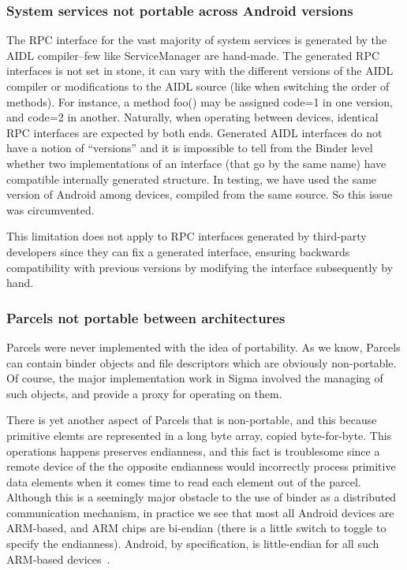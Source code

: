 \documentclass[prodmode]{acmlarge}
\begin{document}
\subsubsection{System services not portable across Android versions}
The RPC interface for the vast majority of system services is generated by the AIDL compiler--few like ServiceManager are hand-made. The generated RPC interfaces is not set in stone, it can vary with the different versions of the AIDL compiler or modifications to the AIDL source (like when switching the order of methods). For instance, a method foo() may be assigned code=1 in one version, and code=2 in another. Naturally, when operating between devices, identical RPC interfaces are expected by both ends. Generated AIDL interfaces do not have a notion of ``versions'' and it is impossible to tell from the Binder level whether two implementations of an interface (that go by the same name) have compatible internally generated structure. In testing, we have used the same version of Android among devices, compiled from the same source. So this issue was circumvented.

This limitation does not apply to RPC interfaces generated by third-party developers since they can fix a generated interface, ensuring backwards compatibility with previous versions by modifying the interface subsequently by hand.

\subsubsection{Parcels not portable between architectures}
Parcels were never implemented with the idea of portability. As we know, Parcels can contain binder objects and file descriptors which are obviously non-portable. Of course, the major implementation work in Sigma involved the managing of such objects, and provide a proxy for operating on them.

There is yet another aspect of Parcels that is non-portable, and this because primitive elemts are represented in a long byte array, copied byte-for-byte. This operations happens preserves endianness, and this fact is troublesome since a remote device of the the opposite endianness would incorrectly process primitive data elements when it comes time to read each element out of the parcel. Although this is a seemingly major obstacle to the use of binder as a distributed communication mechanism, in practice we see that most all Android devices are ARM-based, and ARM chips are bi-endian (there is a little switch to toggle to specify the endianness). Android, by specification, is little-endian for all such ARM-based devices~\cite{ARMLittleEndian}.
\end{document}
